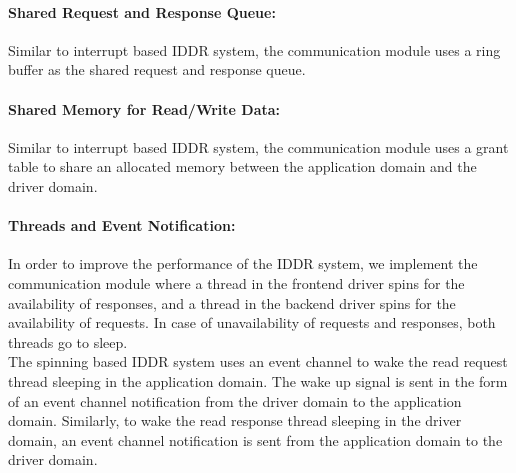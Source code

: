 \paragraph{Shared Request and Response Queue:}
Similar to interrupt based IDDR system, the communication module uses a ring buffer as the shared request and response queue. 

\paragraph{Shared Memory for Read/Write Data:}
Similar to interrupt based IDDR system, the communication module uses a grant table to share an allocated memory between the application domain and the driver domain. 

\paragraph{Threads and Event Notification:}
In order to improve the performance of the IDDR system, we implement the communication module where a thread in the frontend driver spins for the availability of responses, and a thread in the backend driver spins for the availability of requests. In case of unavailability of requests and responses, both threads go to sleep. 
\\[3mm] 
The spinning based IDDR system uses an event channel to wake the read request thread sleeping in the application domain. The wake up signal is sent in the form of an event channel notification from the driver domain to the application domain. Similarly, to wake the read response thread sleeping in the driver domain, an event channel notification is sent from the application domain to the driver domain.

